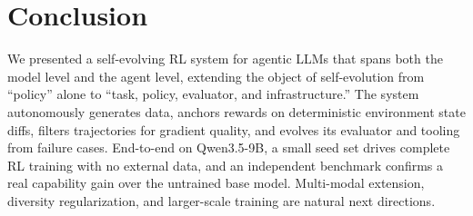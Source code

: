 \documentclass[twocolumn,a4paper]{ctexart}
\begin{document}
\section{Conclusion}

We presented a self-evolving RL system for agentic LLMs that spans both the model level and the agent level, extending the object of self-evolution from ``policy'' alone to ``task, policy, evaluator, and infrastructure.'' The system autonomously generates data, anchors rewards on deterministic environment state diffs, filters trajectories for gradient quality, and evolves its evaluator and tooling from failure cases. End-to-end on Qwen3.5-9B, a small seed set drives complete RL training with no external data, and an independent benchmark confirms a real capability gain over the untrained base model. Multi-modal extension, diversity regularization, and larger-scale training are natural next directions.
\end{document}
